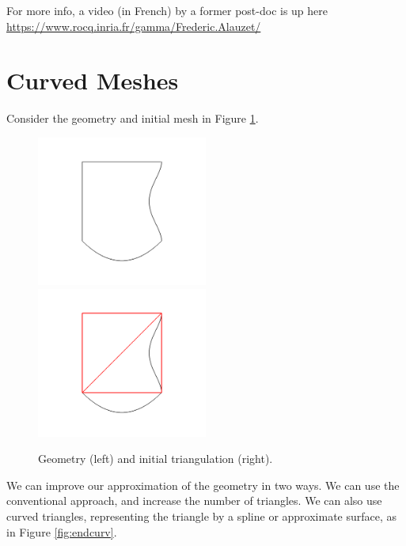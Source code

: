\documentclass[12pt]{article}
\begin{document}
For more info, a video (in French) by a former post-doc is up here
\url{https://www.rocq.inria.fr/gamma/Frederic.Alauzet/}

\section{Curved Meshes}
Consider the geometry and initial mesh in Figure \ref{fig:initcurv}.
\begin{figure}
\includegraphics[width=0.5\textwidth]{images/curvedgeom.png}
\includegraphics[width=0.5\textwidth]{images/curved1.png}
\caption{Geometry (left) and initial triangulation (right).}
\label{fig:initcurv}
\end{figure}
We can improve our approximation of the geometry in two ways. We can use the
conventional approach, and increase the number of triangles. We can also use
curved triangles, representing the triangle by a spline or approximate surface,
as in Figure \ref{fig:endcurv}.
\end{document}
